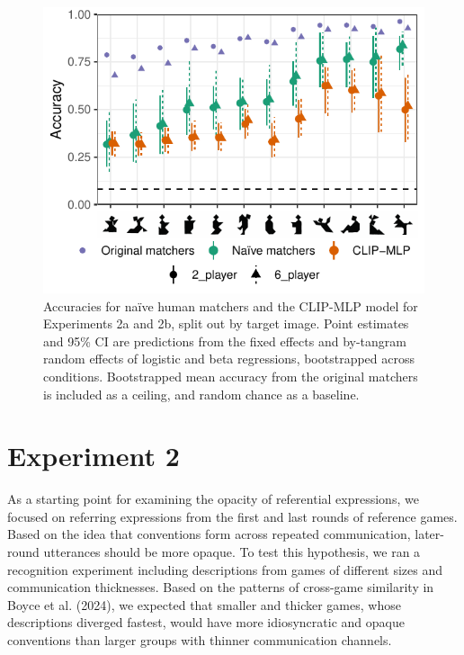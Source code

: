 \documentclass[10pt, letterpaper]{article}
\begin{document}
\begin{CodeChunk}
\begin{figure}[t]

{\centering \includegraphics[width=0.9\linewidth]{figs/fig-2-1} 

}

\caption[Accuracies for naïve human matchers and the CLIP-MLP model for Experiments 2a and 2b, split out by target image]{Accuracies for naïve human matchers and the CLIP-MLP model for Experiments 2a and 2b, split out by target image. Point estimates and 95\% CI are predictions from the fixed effects and by-tangram random effects of logistic and beta regressions, bootstrapped across conditions. Bootstrapped mean accuracy from the original matchers is included as a ceiling, and random chance as a baseline. \label{expt2-tangram}}\label{fig:fig-2}
\end{figure}
\end{CodeChunk}

\section{Experiment 2}\label{experiment-2}

As a starting point for examining the opacity of referential
expressions, we focused on referring expressions from the first and last
rounds of reference games. Based on the idea that conventions form
across repeated communication, later-round utterances should be more
opaque. To test this hypothesis, we ran a recognition experiment
including descriptions from games of different sizes and communication
thicknesses. Based on the patterns of cross-game similarity in Boyce et
al. (2024), we expected that smaller and thicker games, whose
descriptions diverged fastest, would have more idiosyncratic and opaque
conventions than larger groups with thinner communication channels.
\end{document}

